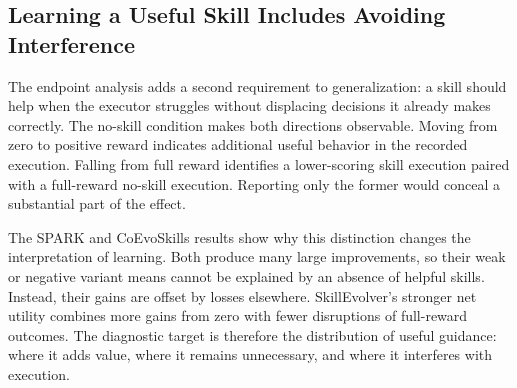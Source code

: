 \subsection{Learning a Useful Skill Includes Avoiding Interference}

The endpoint analysis adds a second requirement to generalization: a skill should help when the executor struggles without displacing decisions it already makes correctly. The no-skill condition makes both directions observable. Moving from zero to positive reward indicates additional useful behavior in the recorded execution. Falling from full reward identifies a lower-scoring skill execution paired with a full-reward no-skill execution. Reporting only the former would conceal a substantial part of the effect.

The SPARK and CoEvoSkills results show why this distinction changes the interpretation of learning. Both produce many large improvements, so their weak or negative variant means cannot be explained by an absence of helpful skills. Instead, their gains are offset by losses elsewhere. SkillEvolver's stronger net utility combines more gains from zero with fewer disruptions of full-reward outcomes. The diagnostic target is therefore the distribution of useful guidance: where it adds value, where it remains unnecessary, and where it interferes with execution.
